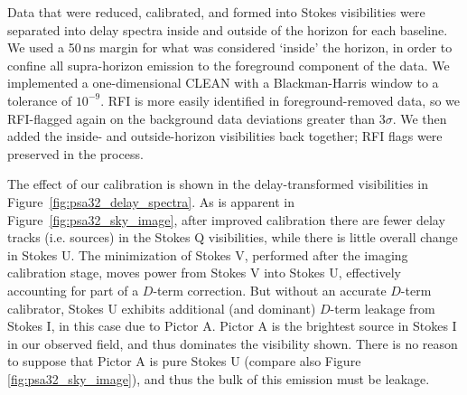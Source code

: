 Data that were reduced, calibrated, and formed into Stokes visibilities were separated into delay spectra inside and outside of the horizon for each baseline. We used a 50\,ns margin for what was considered `inside' the horizon, in order to confine all supra-horizon emission \citep[e.g.][]{Parsons.12a, Pober.13} to the foreground component of the data. We implemented a one-dimensional CLEAN \citep{ParsonsBacker.09, Parsons.12b} with a Blackman-Harris window to a tolerance of $10^{-9}$. RFI is more easily identified in foreground-removed data, so we RFI-flagged again on the background data deviations greater than $3\sigma$. We then added the inside- and outside-horizon visibilities back together; RFI flags were preserved in the process. 

The effect of our calibration is shown in the delay-transformed visibilities in Figure~\ref{fig:psa32_delay_spectra}. As is apparent in Figure~\ref{fig:psa32_sky_image}, after improved calibration there are fewer delay tracks (i.e. sources) in the Stokes Q visibilities, while there is little overall change in Stokes U. The minimization of Stokes V, performed after the imaging calibration stage, moves power from Stokes V into Stokes U, effectively accounting for part of a $D$-term correction. But without an accurate $D$-term calibrator, Stokes U exhibits additional (and dominant) $D$-term leakage from Stokes I, 
in this case due to Pictor A. Pictor A is the brightest source in Stokes I in our observed field, and thus dominates the visibility shown.  There is no reason to suppose that Pictor A is pure Stokes U (compare also Figure \ref{fig:psa32_sky_image}), and thus the bulk of this emission must be leakage.


